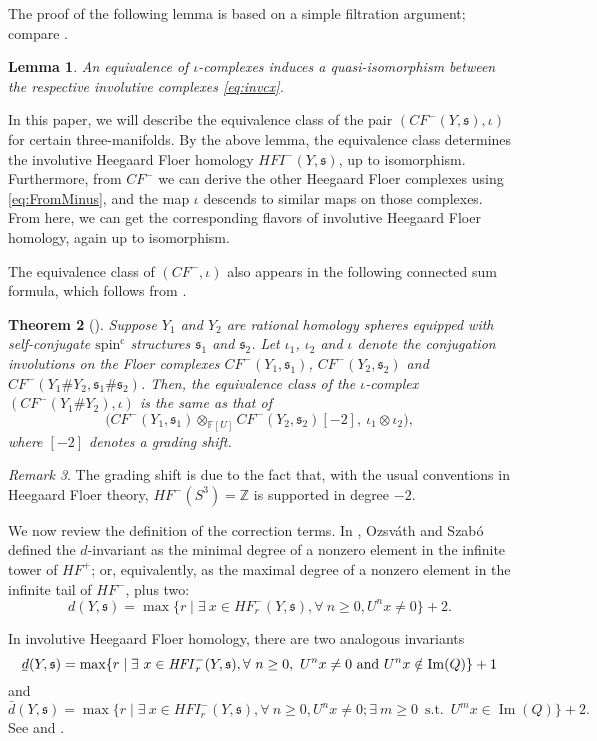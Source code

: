 \documentclass[11 pt]{amsart}
\newtheorem {theorem}{Theorem}[section]
\newtheorem {lemma}[theorem]{Lemma}
\theoremstyle{remark}
\newtheorem {remark}[theorem]{Remark}
\newcommand\Z{\mathbb{Z}}
\def\spinc {{\operatorname{spin^c}}}
\def\s{\mathfrak s}
\def\ff {{\mathbb{F}}}
\newcommand{\bunderline}[1]{\underline{#1\mkern-2mu}\mkern2mu }
\def\du {\bar{d}}
\def\dl {\bunderline{d}}
\def\CF {\mathit{CF}}
\def\HF {\mathit{HF}}
\newcommand\HFp {\HF^+}
\newcommand \CFm {\CF^-}
\newcommand \HFm {\HF^-}
\def\HFI {\mathit{HFI}}
\newcommand \HFIm {\HFI^-}
\def\inv{\iota}
\begin{document}
The proof of the following lemma is based on a simple filtration argument; compare \cite[proof of Proposition 2.8]{HMinvolutive}.
\begin{lemma}
\label{lem:EquivCones}
An equivalence of $\inv$-complexes induces a quasi-isomorphism between the respective involutive complexes \eqref{eq:invcx}. 
\end{lemma}

In this paper, we will describe the equivalence class of the pair $(\CFm(Y, \s), \inv)$ for certain three-manifolds. By the above lemma, the equivalence class determines the involutive Heegaard Floer homology $\HFIm(Y, \s)$, up to isomorphism. Furthermore, from $\CFm$ we can derive the other Heegaard Floer complexes using \eqref{eq:FromMinus}, and the map $\inv$ descends to similar maps on those complexes. From here, we can get the corresponding flavors of involutive Heegaard Floer homology, again up to isomorphism.

The equivalence class of $(\CFm, \inv)$ also appears in the following connected sum formula, which follows from \cite[Theorem 1.1]{HMZ}.
\begin{theorem}[\cite{HMZ}]
\label{thm:ConnSum}
Suppose $Y_1$ and $Y_2$ are rational homology spheres equipped with self-conjugate $\spinc$ structures $\s_1$ and $\s_2$. Let $\inv_1$, $\inv_2$ and $\inv$ denote the conjugation involutions on the Floer complexes $\CFm(Y_1, \s_1)$, $\CFm(Y_2,\s_2)$ and $\CFm(Y_1 \# Y_2, \s_1 \# \s_2)$. Then, the equivalence class of the $\inv$-complex $(\CFm(Y_1 \# Y_2), \inv)$ is the same as that of
$$ \bigl( \CFm(Y_1, \s_1) \otimes_{\ff[U]} \CFm(Y_2, \s_2) [-2], \ \inv_1 \otimes \inv_2 \bigr),$$
where $[-2]$ denotes a grading shift.
\end{theorem}

\begin{remark}
The grading shift is due to the fact that, with the usual conventions in Heegaard Floer theory, $\HFm(S^3)=\Z$ is supported in degree $-2$.  
\end{remark}

We now review the definition of the correction terms. In \cite{AbsGraded}, Ozsv\'ath and Szab\'o defined the $d$-invariant as the minimal degree of a nonzero element in the infinite tower of $\HFp$; or, equivalently, as the maximal degree of a nonzero element in the infinite tail of $\HFm$, plus two:
$$ d(Y, \s) =  \max \{r \mid \exists \ x \in \HFm_r(Y,\s),\forall \ n \geq 0, U^nx\neq 0\} +2. $$

In involutive Heegaard Floer homology, there are two analogous invariants
\[ \dl(Y,\s) = \max \{r \mid \exists \ x \in \HFIm_r(Y, \s), \forall \ n \geq 0, \ U^nx\neq 0 \ \text{and} \ U^nx \notin \operatorname{Im}(Q)\} + 1 \]
and
\[ \du(Y,\s) = \max \{r \mid \exists \ x \in \HFIm_r(Y,\s),\forall \ n \geq 0, U^nx\neq 0; \exists \ m\geq 0 \ \operatorname{s.t.} \ U^m x \in \operatorname{Im}(Q)\} +2.\]
See \cite[Section 5.1]{HMinvolutive} and \cite[Lemma 2.9]{HMZ}. 
\end{document}
